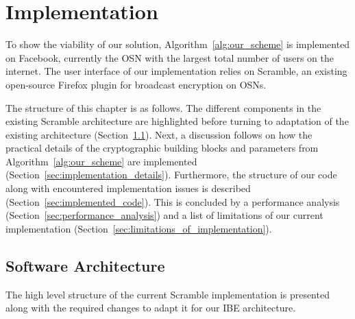 \chapter{Implementation}
\label{cha:n}
To show the viability of our solution, Algorithm~\ref{alg:our_scheme} is implemented on Facebook, currently the OSN with the largest total number of users on the internet. The user interface of our implementation relies on Scramble, an existing open-source Firefox plugin for broadcast encryption on OSNs.

The structure of this chapter is as follows. The different components in the existing Scramble architecture are highlighted before turning to adaptation of the existing architecture (Section~\ref{sec:software_architecture}). Next, a discussion follows on how the practical details of the cryptographic building blocks and parameters from Algorithm~\ref{alg:our_scheme} are implemented (Section~\ref{sec:implementation_details}). Furthermore, the structure of our code along with encountered implementation issues is described (Section~\ref{sec:implemented_code}). This is concluded by a performance analysis (Section~\ref{sec:performance_analysis}) and a list of limitations of our current implementation (Section~\ref{sec:limitations_of_implementation}).



\section{Software Architecture}
\label{sec:software_architecture}
The high level structure of the current Scramble implementation is presented along with the required changes to adapt it for our IBE architecture.

